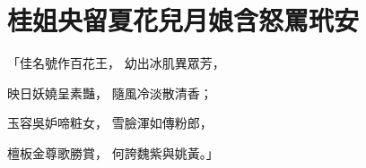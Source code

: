 %

\chapter{桂姐央留夏花兒\KG 月娘含怒罵玳安}


\begin{showcontents}{}



「佳名號作百花王，  幼出冰肌異眾芳，

映日妖嬈呈素豔，  隨風冷淡散清香；

玉容吳妒啼粧女，  雪臉渾如傳粉郎，

檀板金尊歌勝賞，  何誇魏紫與姚黃。」


\end{showcontents}

